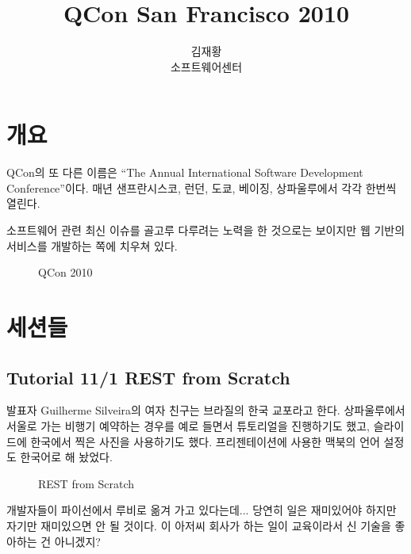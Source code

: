 \documentclass[a4paper]{article}
\title{QCon San Francisco 2010}
\author{김재황 \\ 소프트웨어센터}
\begin{document}
\maketitle

\section{개요}

QCon의 또 다른 이름은 ``The Annual International Software Development
Conference''이다. 매년 샌프란시스코, 런던, 도쿄, 베이징, 상파울루에서
각각 한번씩 열린다. 

소프트웨어 관련 최신 이슈를 골고루 다루려는 노력을 한 것으로는 
보이지만 웹 기반의 서비스를 개발하는 쪽에 치우쳐 있다.

\begin{figure}[t]
    \begin{Frame}
        \begin{center}
        \end{center}
    \end{Frame}
    \caption{QCon 2010}
    \label{qcon}
\end{figure}

\section{세션들}

\subsection{Tutorial 11/1 REST from Scratch}

발표자 Guilherme Silveira의 여자 친구는 브라질의 한국 교포라고 한다.
상파울루에서 서울로 가는 비행기 예약하는 경우를 예로 들면서 튜토리얼을 
진행하기도 했고, 슬라이드에 한국에서 찍은 사진을 사용하기도 했다.
프리젠테이션에 사용한 맥북의 언어 설정도 한국어로 해 놨었다.

\begin{figure}[t]
    \begin{Frame}
        \begin{center}
        \end{center}
    \end{Frame}
    \caption{REST from Scratch}
    \label{REST}
\end{figure}

개발자들이 파이선에서 루비로 옮겨 가고 있다는데... 당연히 일은
재미있어야 하지만 자기만 재미있으면 안 될 것이다. 이 아저씨 회사가 하는
일이 교육이라서 신 기술을 좋아하는 건 아니겠지?
\end{document}
